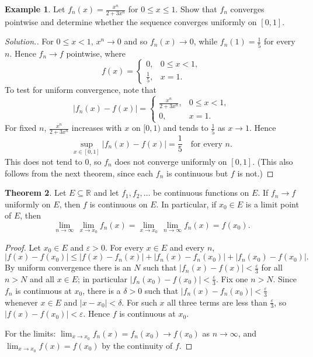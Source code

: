 \documentclass[11pt,a4paper]{article}
\numberwithin{equation}{section}
\theoremstyle{definition}
\newtheorem{thm}{Theorem}[subsection]
\newtheorem{exa}[thm]{Example}
\newenvironment{solution}
  {\renewcommand{\qedsymbol}{}\begin{proof}[\textit{Solution}.]}
  {\end{proof}}
\begin{document}
\begin{exa}
Let $f_n(x) = \frac{x^n}{2 + 3 x^n}$ for $0\leq x\leq 1$. Show that $f_n$ converges pointwise and determine whether the sequence converges uniformly on $[0,1]$.
\end{exa}

\begin{solution}
For $0\leq x<1$, $x^n\longrightarrow 0$ and so $f_n(x)\longrightarrow 0$, while $f_n(1) = \frac{1}{5}$ for every $n$. Hence $f_n \longrightarrow f$ pointwise, where
\[
f(x) = \begin{cases}
0, & 0\leq x < 1,\\
\frac{1}{5}, & x = 1.
\end{cases}
\]
To test for uniform convergence, note that
$$|f_n(x) - f(x)|  = \begin{cases}
\frac{x^n}{2 + 3x^n}, & 0\leq x < 1,\\
0, & x = 1.
\end{cases}$$
For fixed $n$, $\frac{x^n}{2 + 3x^n}$ increases with $x$ on $[0,1)$ and tends to $\frac{1}{5}$ as $x\longrightarrow 1$. Hence
\[
\sup_{x\in [0,1]}|f_n(x) - f(x)| = \frac{1}{5} \quad\text{for every } n .
\]
This does not tend to $0$, so $f_n$ does not converge uniformly on $[0,1]$. (This also follows from the next theorem, since each $f_n$ is continuous but $f$ is not.)
\end{solution}


\begin{thm}
Let $E\subseteq \mathbb{R}$ and let $f_1, f_2, \dots$ be continuous functions on $E$. If $f_n \longrightarrow f$ uniformly on $E$, then $f$ is continuous on $E$. In particular, if $x_0\in E$ is a limit point of $E$, then
$$\lim_{n \rightarrow \infty}\, \lim_{x\rightarrow x_0} f_n(x) = \lim_{x\rightarrow x_0} \,\lim_{n\rightarrow \infty} f_n(x) = f(x_0).$$
\end{thm}

\begin{proof}
Let $x_0\in E$ and $\varepsilon>0$. For every $x\in E$ and every $n$,
$$|f(x) - f(x_0)|\leq |f(x) - f_n(x)| + |f_n(x) - f_n(x_0)| + |f_n(x_0) - f(x_0)| .$$
By uniform convergence there is an $N$ such that $|f_n(x) - f(x)| < \frac{\varepsilon}{3}$ for all $n> N$ and all $x\in E$; in particular $|f_n(x_0) - f(x_0)| < \frac{\varepsilon}{3}$. Fix one $n>N$. Since $f_n$ is continuous at $x_0$, there is a $\delta > 0$ such that $|f_n(x) - f_n(x_0)|< \frac{\varepsilon}{3}$ whenever $x\in E$ and $|x - x_0| < \delta$. For such $x$ all three terms are less than $\frac{\varepsilon}{3}$, so $|f(x) - f(x_0)| < \varepsilon$. Hence $f$ is continuous at $x_0$.

For the limits: $\lim_{x\rightarrow x_0} f_n(x) = f_n(x_0)\longrightarrow f(x_0)$ as $n\longrightarrow\infty$, and $\lim_{x\rightarrow x_0} f(x) = f(x_0)$ by the continuity of $f$.
\end{proof}
\end{document}
